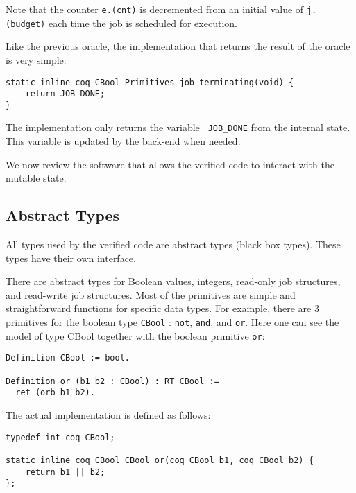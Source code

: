 	Note that the counter \texttt{e.(cnt)} is decremented from an initial value of \texttt{j.(budget)} each time the job is scheduled for execution. 

	Like the previous oracle, the implementation that returns the result of the oracle is very simple:

	\begin{verbatim}
static inline coq_CBool Primitives_job_terminating(void) {
    return JOB_DONE;
}
	\end{verbatim}

	The implementation only returns the variable \texttt{ JOB\_DONE} from the internal state. This variable is updated by the back-end when needed.

	We now review the software that allows the verified code to interact with the mutable state.

	\subsection{Abstract Types}

	All types used by the verified code are abstract types (black box types). These types have their own interface. 

	There are abstract types for Boolean values, integers, read-only job structures, and read-write job structures. Most of the primitives are simple and straightforward functions for specific data types. For example, there are 3 primitives for the boolean type \texttt{CBool} : \texttt{not}, \texttt{and}, and \texttt{or}.
	Here one can see the model of type CBool together with the boolean primitive \texttt{or}:

	\begin{verbatim}
Definition CBool := bool.

Definition or (b1 b2 : CBool) : RT CBool :=
  ret (orb b1 b2).
	\end{verbatim}

	The actual implementation is defined as follows:

	\begin{verbatim}
typedef int coq_CBool;

static inline coq_CBool CBool_or(coq_CBool b1, coq_CBool b2) {
    return b1 || b2;
};
	\end{verbatim}

